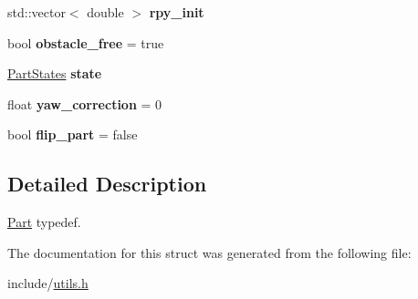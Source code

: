 \begin{DoxyCompactItemize}
\mbox{\label{structPart_a3765b86daac903e72665835d3b5d161c}} 
std\+::vector$<$ double $>$ {\bfseries rpy\+\_\+init}
\item 
\mbox{\label{structPart_a04fb40a72118482392aa85f3d32d81d7}} 
bool {\bfseries obstacle\+\_\+free} = true
\item 
\mbox{\label{structPart_a3d0424b1b6ad362298da16ada9c60959}} 
\hyperlink{utils_8h_aaf7e202ccc2e0bac6d05d124e49b11d3}{Part\+States} {\bfseries state}
\item 
\mbox{\label{structPart_a4cd35c6e6cc7bbf220efb3d44cd507ff}} 
float {\bfseries yaw\+\_\+correction} = 0
\item 
\mbox{\label{structPart_a95405a938a218baa4190e372b5ef593d}} 
bool {\bfseries flip\+\_\+part} = false
\end{DoxyCompactItemize}


\subsection{Detailed Description}
\hyperlink{structPart}{Part} typedef. 

The documentation for this struct was generated from the following file\+:\begin{DoxyCompactItemize}
\item 
include/\hyperlink{utils_8h}{utils.\+h}\end{DoxyCompactItemize}
